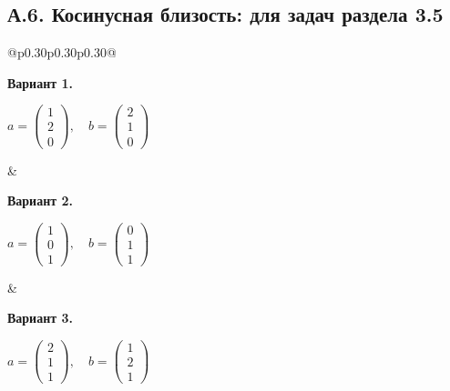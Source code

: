 \documentclass[12pt,a4paper]{article}
\begin{document}
\subsection*{А.6. Косинусная близость: для задач раздела 3.5}
{\small
\begin{longtable}{@{}p{0.30\textwidth}p{0.30\textwidth}p{0.30\textwidth}@{}}
\begin{minipage}[t]{\linewidth}\vspace{0pt}\raggedright\setlength{\parskip}{0pt}
\textbf{Вариант 1.}\par\smallskip
\(\displaystyle  a=\begin{pmatrix}1\\2\\0\end{pmatrix},\quad b=\begin{pmatrix}2\\1\\0\end{pmatrix}\)\par
\end{minipage} &
\begin{minipage}[t]{\linewidth}\vspace{0pt}\raggedright\setlength{\parskip}{0pt}
\textbf{Вариант 2.}\par\smallskip
\(\displaystyle  a=\begin{pmatrix}1\\0\\1\end{pmatrix},\quad b=\begin{pmatrix}0\\1\\1\end{pmatrix}\)\par
\end{minipage} &
\begin{minipage}[t]{\linewidth}\vspace{0pt}\raggedright\setlength{\parskip}{0pt}
\textbf{Вариант 3.}\par\smallskip
\(\displaystyle  a=\begin{pmatrix}2\\1\\1\end{pmatrix},\quad b=\begin{pmatrix}1\\2\\1\end{pmatrix}\)\par
\end{minipage}\\\noalign{\vskip 14pt}

\end{longtable}}
\end{document}
